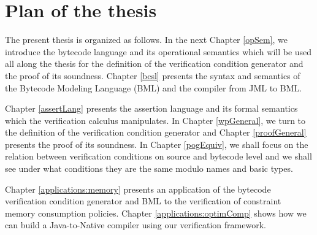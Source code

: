 \section{Plan of the thesis}


The present thesis is organized as follows. In the next Chapter \ref{opSem}, we introduce
 the bytecode language and its operational semantics which will be used all along the thesis for the definition of the verification condition generator and the proof
of its soundness. 
Chapter \ref{bcsl} presents the syntax and semantics of the Bytecode Modeling Language (BML) and the compiler from JML to BML. 

Chapter \ref{assertLang} presents the assertion language and its formal semantics which the verification calculus manipulates. 
In Chapter \ref{wpGeneral}, we turn to the definition of the verification condition generator and Chapter \ref{proofGeneral}
 presents the proof of its soundness. In Chapter \ref{pogEquiv}, we shall focus on the relation between 
verification conditions on source and bytecode level and we shall see under what conditions they are the same modulo names and basic types.
   
Chapter \ref{applications:memory} presents an application of the bytecode verification condition generator and BML to the verification of constraint memory consumption
policies. Chapter \ref{applications:optimComp} shows how we can build a Java-to-Native compiler using our verification framework.




